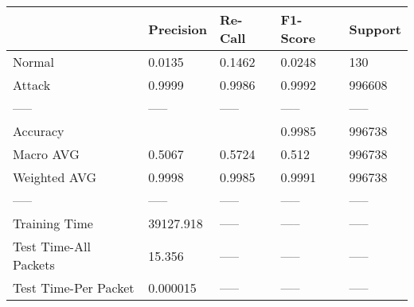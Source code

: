 \begin{tabular}{lllll}
\toprule
{} &  Precision & Re-Call & F1-Score & Support \\
\midrule
Normal                &     0.0135 &  0.1462 &   0.0248 &     130 \\
Attack                &     0.9999 &  0.9986 &   0.9992 &  996608 \\
-----                 &      ----- &   ----- &    ----- &   ----- \\
Accuracy              &            &         &   0.9985 &  996738 \\
Macro AVG             &     0.5067 &  0.5724 &    0.512 &  996738 \\
Weighted AVG          &     0.9998 &  0.9985 &   0.9991 &  996738 \\
-----                 &      ----- &   ----- &    ----- &   ----- \\
Training Time         &  39127.918 &   ----- &    ----- &   ----- \\
Test Time-All Packets &     15.356 &   ----- &    ----- &   ----- \\
Test Time-Per Packet  &   0.000015 &   ----- &    ----- &   ----- \\
\bottomrule
\end{tabular}
